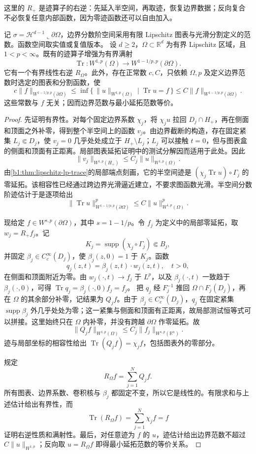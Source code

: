 这里的 \(R_+\) 是迹算子的右逆：先延入半空间，再取迹，恢复边界数据；反向复合不必恢复任意内部函数，因为零迹函数还可以自由加入。

\begin{theorem}\label{b1:thm:lipschitz-fractional-trace}
记 \(\sigma=\mathcal H^{d-1}\llcorner\partial\Omega\)，边界分数阶空间采用有限 Lipschitz 图表与光滑分割定义的范数。函数空间取实值或复值版本。
设 \(d\ge2\)，\(\Omega\subset\mathbb R^d\) 为有界 Lipschitz 区域，且 \(1<p<\infty\)。既有的迹算子增强为有界满射
\[
 \operatorname{Tr}:W^{1,p}(\Omega)
 \longrightarrow W^{1-1/p,p}(\partial\Omega).
\]
它有一个有界线性右逆 \(R_\Omega\)。此外，存在正常数 \(c,C\)，只依赖 \(\Omega,p\) 及定义边界范数时选定的图表和分割函数，使
\[
 c\|f\|_{W^{1-1/p,p}(\partial\Omega)}
 \leq
 \inf\bigl\{\,\|u\|_{W^{1,p}(\Omega)}
        \mid \operatorname{Tr}u=f\,\bigr\}
 \leq C\|f\|_{W^{1-1/p,p}(\partial\Omega)}.
\]
这些常数与 \(f\) 无关；因而边界范数与最小延拓范数等价。
\end{theorem}
\begin{proof}
先证明有界性。对每个固定边界系数 \(\chi_j\)，将 \(\chi_j u\) 拉回 \(D_j\cap H_+\)，再在侧面和顶面之外补零，得到整个半空间上的函数 \(v_j\)。由边界截断的构造，存在固定紧集 \(L_j\Subset D_j\)，使 \(v_j=0\) 几乎处处成立于 \(H_+\setminus L_j\)；\(L_j\) 可以接触 \(t=0\)，但与图表盒的侧面和顶面有正距离。局部图表延拓证明中的测试分解因而适用于此处。因此
\[
 \|v_j\|_{W^{1,p}(H_+)}
 \le C_j\|u\|_{W^{1,p}(\Omega)}.
\]
由\cref{b1:thm:lipschitz-lp-trace}的局部端点刻画，它的半空间迹是
\((\chi_j\operatorname{Tr}u)\circ\Gamma_j\) 的零延拓。该相容性已经通过跨边界光滑逼近建立，不要求图函数光滑。半空间分数阶迹估计于是逐项给出
\[
 \|\operatorname{Tr}u\|_{W^{1-1/p,p}(\partial\Omega)}^p
 \le C\|u\|_{W^{1,p}(\Omega)}^p.
\]

现给定 \(f\in W^{s,p}(\partial\Omega)\)，其中 \(s=1-1/p\)。令 \(f_j\) 为定义中的局部零延拓，取 \(w_j=R_+f_j\)。记
\[
 K_j=\operatorname{supp}(\chi_j\circ\Gamma_j)\Subset B_j,
\]
并固定 \(\beta_j\in C_c^\infty(D_j)\)，使
\(\beta_j(z,0)=1\) 于 \(K_j\)。函数
\[
 q_j(z,t)=\beta_j(z,t)\cdot w_j(z,t),\quad t>0,
\]
在侧面和顶面附近为零。由 \(w_j(\cdot,t)\to f_j\) 于 \(L^p\)，以及 \(\beta_j(\cdot,t)\) 一致趋于 \(\beta_j(\cdot,0)\)，可得
\(\operatorname{Tr}q_j=\beta_j(\cdot,0)f_j=f_j\)。
把 \(q_j\) 经 \(F_j^{-1}\) 推回 \(\Omega\cap F_j(D_j)\)，再在 \(\Omega\) 的其余部分补零，记结果为 \(Q_jf\)。由于 \(\beta_j\in C_c^\infty(D_j)\)，\(q_j\) 在固定紧集 \(\operatorname{supp}\beta_j\) 外几乎处处为零；这一紧集与侧面和顶面有正距离，故局部测试恒等式可以拼接。这里始终只在 \(\Omega\) 内补零，并没有跨越 \(\partial\Omega\) 作零延拓。故
\[
 \|Q_jf\|_{W^{1,p}(\Omega)}
 \le C_j\|f_j\|_{W^{s,p}(\mathbb R^n)}.
\]
迹与局部坐标的相容性给出
\(\operatorname{Tr}(Q_jf)=\chi_j f\)，包括图表外的零部分。

规定
\[
 R_\Omega f=\sum_{j=1}^N Q_jf.
\]
所有图表、边界系数、卷积核与 \(\beta_j\) 都固定不变，所以它是线性的。有限求和与上述估计给出有界性，而
\[
 \operatorname{Tr}(R_\Omega f)
 =\sum_{j=1}^N\chi_j f=f
\]
证明右逆性质和满射性。最后，对任意迹为 \(f\) 的 \(u\)，迹估计给出边界范数不超过 \(C\|u\|_{W^{1,p}}\)；反向取 \(u=R_\Omega f\) 即得最小延拓范数的等价关系。
\end{proof}

